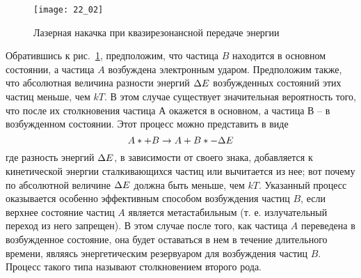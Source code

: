 \begin{figure}[h!]
    \center
    \texttt{[image: 22\_02]}
    \caption{Лазерная накачка при квазирезонансной передаче энергии}
    \label{img22.2}
\end{figure}

Обратившись к рис.~\ref{img22.2}, предположим, что частица \( B \) находится в 
основном состоянии, а частица \( A \) возбуждена электронным ударом. Предположим 
также, что абсолютная величина разности энергий \( \Delta E \) возбужденных 
состояний этих частиц меньше, чем \( kT \). В этом случае существует 
значительная вероятность того, что после их столкновения частица \( А \) 
окажется в основном, а частица \( В \) -- в возбужденном состоянии. Этот 
процесс можно представить в виде
\[
	A* + B \rightarrow A + B* - \Delta E
\]
где разность энергий \( \Delta E \), в зависимости от своего знака, добавляется к 
кинетической энергии сталкивающихся частиц или вычитается из нее; вот почему 
по абсолютной величине \( \Delta E \) должна быть меньше, чем \( kT \). Указанный
процесс оказывается особенно эффективным способом возбуждения частиц \( B \), 
если верхнее состояние частиц \( A \) является метастабильным (т. е. 
излучательный переход из него запрещен). В этом случае после того, как частица 
\( A \) переведена в возбужденное состояние, она будет оставаться в нем в 
течение длительного времени, являясь энергетическим резервуаром для 
возбуждения частиц \( B \). Процесс такого типа называют столкновением второго 
рода.
